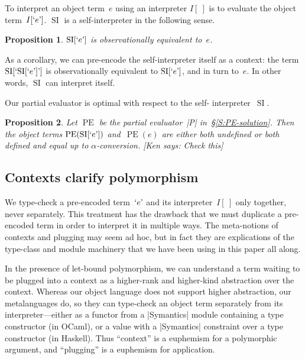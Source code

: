 \documentclass[preprint]{sigplanconf}
\newcommand{\ccshan}[1]{{\it [Ken says: #1]}}
\newtheorem{prop}{Proposition}
\newcommand{\encode}[1]{\mathinner{\mathopen{\text{`}}#1\mathclose{\text{'}}}}
\DeclareMathOperator{\pe}{PE}
\DeclareMathOperator{\si}{SI}
\begin{document}
To interpret an object term~$e$ using an interpreter $I[~]$ is to
evaluate the object term~$I[\encode{e}]$.  $\si$ is
a self\hyp interpreter in the following sense.
\begin{prop}
    $\si[\encode{e}]$ is observationally equivalent to~$e$.
\end{prop}
As a corollary, we can pre-encode the self\hyp interpreter itself as
a context: the term $\si[\encode{\si[\encode{e}]}]$ is observationally
equivalent to $\si[\encode{e}]$, and in turn to~$e$.  In other words,
$\si$ can interpret itself.

Our partial evaluator is optimal with respect to the self\hyp
interpreter~$\si$.
\begin{prop}
    Let $\pe$ be the partial evaluator~|P| in~\S\ref{S:PE-solution}.
    Then the object terms $\pe(\si[\encode{e}])$ and~$\pe(e)$ are
    either both undefined or both defined and
    equal up to $\alpha$\hyp conversion.
    \ccshan{Check this}
\end{prop}

\subsection{Contexts clarify polymorphism}

We type-check a pre-encoded term~$\encode{e}$ and its interpreter~$I[~]$
only together, never separately.  This treatment has the drawback that
we must duplicate a pre-encoded term in order to interpret it in
multiple ways.  The meta-notions of contexts and plugging may seem ad
hoc, but in fact they are explications of the type-class and module
machinery that we have been using in this paper all along.

In the presence of let-bound polymorphism, we can understand a term
waiting to be plugged into a context as a higher-rank and higher-kind abstraction over
the context.  Whereas our object language does not support higher
abstraction, our metalanguages do, so they can type-check an object term
separately from its interpreter---either as a functor from a |Symantics| module
containing a type constructor
(in OCaml), or a value with a |Symantics| constraint over a type
constructor (in Haskell).  Thus
``context'' is a euphemism for a polymorphic argument, and ``plugging''
is a euphemism for application.
\end{document}
